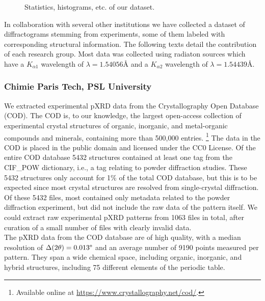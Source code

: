 \begin{figure*}[!ht]
    \centering
    \missingfigure{} 
    \caption{Statistics, histograms, etc. of our dataset.}
    \label{fig:statistics}
\end{figure*}

In collaboration with several other institutions we have collected a dataset of diffractograms stemming from experiments, some of them labeled with corresponding structural information. The following texts detail the contribution of each research group. Most data was collected using  radiaton sources which have a  $K_{\alpha1}$ wavelength of $\lambda=1.54056\text{\AA}$ and a $K_{\alpha2}$ wavelength of $\lambda=1.54439\text{\AA}$.

\subsubsection*{Chimie Paris Tech, PSL University}

We extracted experimental pXRD data from the Crystallography Open Database (COD)\cite{Grazulis2009, Vaitkus2023}. The COD is, to our knowledge, the largest open-access collection of experimental crystal structures of organic, inorganic, and metal-organic compounds and minerals, containing more than 500,000 entries. \footnote{Available online at \url{https://www.crystallography.net/cod/}.} The data in the COD is placed in the public domain and licensed under the CC0 License. Of the entire COD database 5432 structures contained at least one tag from the {CIF\_POW} dictionary, i.e., a tag relating to powder diffraction studies. These 5432 structures only account for 1\% of the total COD database, but this is to be expected since most crystal structures are resolved from single-crystal diffraction. Of these 5432 files, most contained only metadata related to the powder diffraction experiment, but did not include the raw data of the pattern itself. We could extract raw experimental pXRD patterns from 1063 files in total, after curation of a small number of files with clearly invalid data. \\

The pXRD data from the COD database are of high quality, with a median resolution of $\Delta(2\theta) = 0.013\degree$ and an average number of 9190 points measured per pattern. They span a wide chemical space, including organic, inorganic, and hybrid structures, including 75 different elements of the periodic table.


